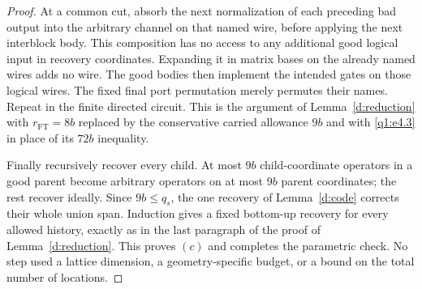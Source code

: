 \begin{proof}
At a common cut, absorb the next normalization of each preceding bad output into the arbitrary channel on that named wire, before applying the next interblock body. This composition has no access to any additional good logical input in recovery coordinates. Expanding it in matrix bases on the already named wires adds no wire. The good bodies then implement the intended gates on those logical wires. The fixed final port permutation merely permutes their names. Repeat in the finite directed circuit. This is the argument of Lemma~\ref{d:reduction} with \(r_{\mathrm{FT}}=8b\) replaced by the conservative carried allowance \(9b\) and with \eqref{q1:e4.3} in place of its \(72b\) inequality.

Finally recursively recover every child. At most \(9b\) child-coordinate operators in a good parent become arbitrary operators on at most \(9b\) parent coordinates; the rest recover ideally. Since \(9b\le q_{s}\), the one recovery of Lemma~\ref{d:code} corrects their whole union span. Induction gives a fixed bottom-up recovery for every allowed history, exactly as in the last paragraph of the proof of Lemma~\ref{d:reduction}. This proves \((c)\) and completes the parametric check. No step used a lattice dimension, a geometry-specific budget, or a bound on the total number of locations. 
\end{proof}



